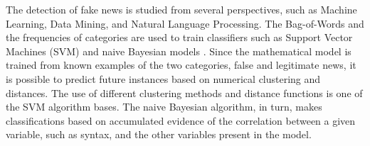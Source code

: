 \documentclass{ieeeaccess}
\begin{document}
The detection of fake news is studied from several perspectives, such as Machine Learning, Data Mining, and Natural Language Processing. The Bag-of-Words and the frequencies of categories are used to train classifiers such as Support Vector Machines (SVM) and naive Bayesian models \cite{poddar2019comparison}. Since the mathematical model is trained from known examples of the two categories, false and legitimate news, it is possible to predict future instances based on numerical clustering and distances. The use of different clustering methods and distance functions is one of the SVM algorithm bases. The naive Bayesian algorithm, in turn, makes classifications based on accumulated evidence of the correlation between a given variable, such as syntax, and the other variables present in the model.
\end{document}
